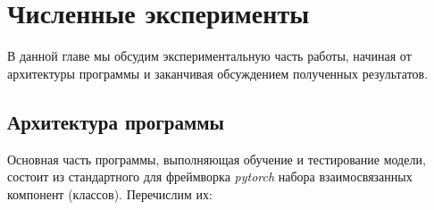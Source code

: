 \section{Численные эксперименты}

\indent
\indent
В данной главе мы обсудим экспериментальную часть работы, начиная от
архитектуры программы и заканчивая обсуждением полученных результатов.



\subsection{Архитектура программы}

\indent
\indent
Основная часть программы, выполняющая обучение и тестирование модели,
 состоит из стандартного для фреймворка \textit{pytorch} набора 
 взаимосвязанных компонент (классов). Перечислим их:

